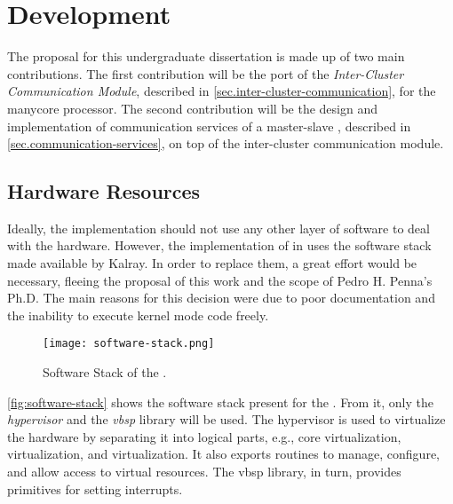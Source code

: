 \chapter{Development}
\label{ch.development}


	The proposal for this undergraduate dissertation is made up of two main contributions.
	The first contribution will be the port of the \textit{Inter-Cluster Communication Module},
	described in \autoref{sec.inter-cluster-communication}, for the \mppa manycore processor.
	The second contribution will be the design and implementation of communication services
	of a master-slave \os, described in \autoref{sec.communication-services}, on top of
	the inter-cluster communication module.


	\section{\mppa Hardware Resources}
	\label{sec.mppa-hardware-resources}


		Ideally, the \hal implementation should not use any other layer of software to
		deal with the hardware. However, the implementation of \hal in \mppa uses the
		software stack made available by Kalray.
		In order to replace them, a great effort would be necessary, fleeing the proposal
		of this work and the scope of Pedro H. Penna's Ph.D.
		The main reasons for this decision were due to poor documentation and the
		inability to execute kernel mode code freely.

		\begin{figure}[!tb]
			\centering
			\caption{Software Stack of the \mppa.}
			\label{fig:software-stack}
			\texttt{[image: software-stack.png]}
		\end{figure}

		\autoref{fig:software-stack} shows the software stack present for the \mppa.
		From it, only the \textit{hypervisor} and the \textit{vbsp} library will be used.
		The hypervisor is used to virtualize the hardware by separating it into logical
		parts, e.g., core virtualization, \cnoc virtualization, and \dnoc virtualization.
		It also exports routines to manage, configure, and allow access to virtual resources.
		The vbsp library, in turn, provides primitives for setting interrupts.

